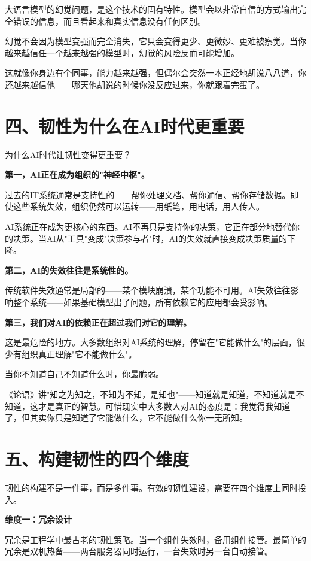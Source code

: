 大语言模型的幻觉问题，是这个技术的固有特性。模型会以非常自信的方式输出完全错误的信息，而且看起来和真实信息没有任何区别。

幻觉不会因为模型变强而完全消失，它只会变得更少、更微妙、更难被察觉。当你越来越信任一个越来越强的模型时，幻觉的风险反而可能增加。

这就像你身边有个同事，能力越来越强，但偶尔会突然一本正经地胡说八八道，你还越来越信他——哪天他胡说的时候你没反应过来，你就跟着完蛋了。

\section{四、韧性为什么在AI时代更重要}


为什么AI时代让韧性变得更重要？

\textbf{第一，AI正在成为组织的"神经中枢"。}

过去的IT系统通常是支持性的——帮你处理文档、帮你通信、帮你存储数据。即使这些系统失效，组织仍然可以运转——用纸笔，用电话，用人传人。

AI系统正在成为更核心的东西。AI不再只是支持你的决策，它正在部分地替代你的决策。当AI从"工具"变成"决策参与者"时，AI的失效就直接变成决策质量的下降。

\textbf{第二，AI的失效往往是系统性的。}

传统软件失效通常是局部的——某个模块崩溃，某个功能不可用。AI失效往往影响整个系统——如果基础模型出了问题，所有依赖它的应用都会受影响。

\textbf{第三，我们对AI的依赖正在超过我们对它的理解。}

这是最危险的地方。大多数组织对AI系统的理解，停留在"它能做什么"的层面，很少有组织真正理解"它不能做什么"。

当你不知道自己不知道什么时，你最脆弱。

《论语》讲"知之为知之，不知为不知，是知也"——知道就是知道，不知道就是不知道，这才是真正的智慧。可惜现实中大多数人对AI的态度是：我觉得我知道了，但其实你只是知道了它能做什么，它不能做什么你一无所知。

\section{五、构建韧性的四个维度}


韧性的构建不是一件事，而是多件事。有效的韧性建设，需要在四个维度上同时投入。

\textbf{维度一：冗余设计}

冗余是工程学中最古老的韧性策略。当一个组件失效时，备用组件接管。最简单的冗余是双机热备——两台服务器同时运行，一台失效时另一台自动接管。

